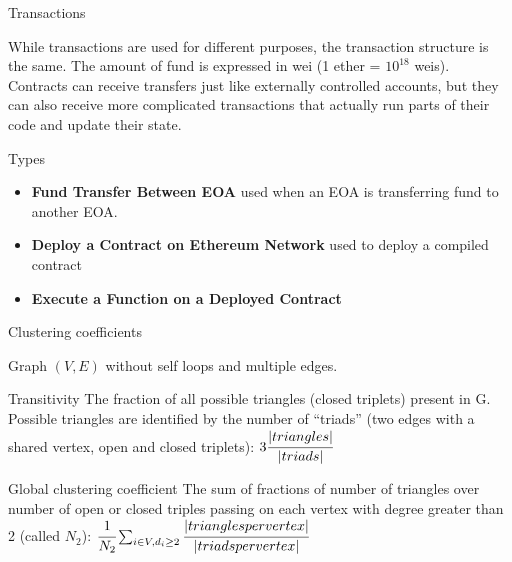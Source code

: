 \documentclass{beamer}
\begin{document}
\begin{frame}{Transactions}
    \begin{block}{}
        While transactions are used for different purposes, the transaction structure is the same.
        The amount of fund is expressed in wei (1 ether = $10^{18}$ weis).
        Contracts can receive transfers just like externally controlled accounts, but they can also receive more complicated transactions that actually run parts of their code and update their state.
    \end{block}

    \vskip 0.5cm

    \begin{block}{Types}
        \begin{itemize}
            \item \textbf{Fund Transfer Between EOA} used when an EOA is transferring fund to another EOA\@.
            \item \textbf{Deploy a Contract on Ethereum Network} used to deploy a compiled contract
            \item \textbf{Execute a Function on a Deployed Contract}
        \end{itemize}
    \end{block}
\end{frame}

\begin{frame}{Clustering coefficients}
    \begin{block}{}
        Graph $(V,E)$ without self loops and multiple edges.
    \end{block}

    \vskip 0.5cm

    \begin{block}{Transitivity}
        The fraction of all possible triangles (closed triplets) present in G. Possible triangles are identified by the number of “triads” (two edges with a shared vertex, open and closed triplets): $3\cfrac{|triangles|}{|triads|}$
    \end{block}

    \begin{block}{Global clustering coefficient}
        The sum of fractions of number of triangles over number of open or closed triples passing on each vertex with degree greater than 2 (called $N_2$):
        $\cfrac{1}{N_2} \sum_{i \in V, d_i \geq 2}\cfrac{|triangles per vertex|}{|triads per vertex|}$
    \end{block}
\end{frame}
\end{document}
